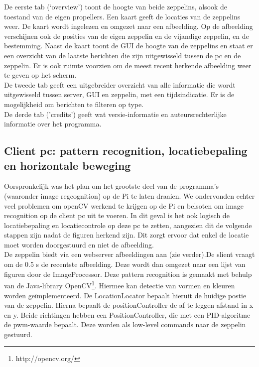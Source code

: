 \documentclass[eind]{penoverslag}
\begin{document}
De eerste tab (`overview') toont de hoogte van beide zeppelins, alsook de toestand van de eigen propellers. Een kaart geeft de locaties van de zeppelins weer. De kaart wordt ingelezen en omgezet naar een afbeelding. Op de afbeelding verschijnen ook de posities van de eigen zeppelin en de vijandige zeppelin, en de bestemming. Naast de kaart toont de GUI de hoogte van de zeppelins en staat er een overzicht van de laatste berichten die zijn uitgewisseld tussen de pc en de zeppelin. Er is ook ruimte voorzien om de meest recent herkende afbeelding weer te geven op het scherm. \\

De tweede tab geeft een uitgebreider overzicht van alle informatie die wordt uitgewisseld tussen server, GUI en zeppelin, met een tijdsindicatie. Er is de mogelijkheid om berichten te filteren op type. \\

De derde tab ('credits') geeft wat versie-informatie en auteursrechterlijke informatie over het programma.

\subsection{Client pc: pattern recognition, locatiebepaling en horizontale beweging}
 Oorspronkelijk was het plan om het grootste deel van de programma's (waaronder image regcognition) op de Pi te laten draaien. We ondervonden echter veel problemen om openCV werkend te krijgen op de Pi en belsoten om image recognition op de client pc uit te voeren. In dit geval is het ook logisch de locatiebepaling en locatiecontrole op deze pc te zetten, aangezien dit de volgende stappen zijn nadat de figuren herkend zijn. Dit zorgt ervoor dat enkel de locatie moet worden doorgestuurd en niet de afbeelding.\\

De zeppelin biedt via een webserver afbeeldingen aan (zie verder).De slient vraagt om de 0.5 s de recentste afbeelding. Deze wordt dan omgezet naar een lijst van figuren door de ImageProcessor. Deze pattern recognition is gemaakt met behulp van de Java-library OpenCV\footnote{http://opencv.org/}. Hiermee kan detectie van vormen en kleuren worden ge\"{i}mplementeerd. De LocationLocator bepaalt hieruit de huidige postie van de zeppelin. Hierna bepaalt de positionController de af te leggen afstand in x en y. Beide richtingen hebben een PositionController, die met een PID-algoritme de pwm-waarde bepaalt. Deze worden als low-level commands naar de zeppelin gestuurd.\\
\end{document}
